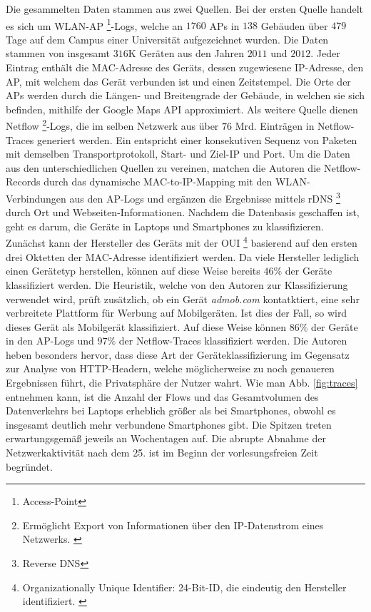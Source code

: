 \documentclass[12pt, a4paper]{article}
\begin{document}
Die gesammelten Daten stammen aus zwei Quellen. Bei der ersten Quelle handelt es sich um WLAN-AP \footnote{Access-Point}-Logs,
welche an $1760$ APs in $138$ Gebäuden über $479$ Tage auf dem Campus einer Universität aufgezeichnet wurden. 
Die Daten stammen von insgesamt $316$\textsc{K} Geräten aus den Jahren $2011$ und $2012$. Jeder Eintrag enthält die 
MAC-Adresse des Geräts, dessen zugewiesene IP-Adresse, den AP, mit welchem das Gerät verbunden ist und einen Zeitstempel.
Die Orte der APs werden durch die Längen- und Breitengrade der Gebäude, in welchen sie sich befinden, mithilfe der Google Maps API
approximiert. Als weitere Quelle dienen Netflow \footnote{Ermöglicht Export von Informationen über den IP-Datenstrom eines 
Netzwerks. \cite{RFC3954}}-Logs, die im selben Netzwerk aus über $76$ Mrd. Einträgen in Netflow-Traces generiert werden.
Ein  entspricht einer konsekutiven Sequenz von Paketen
mit demselben Transportprotokoll, Start- und Ziel-IP und Port. \cite{Alipour2018}
Um die Daten aus den unterschiedlichen Quellen zu vereinen, matchen die Autoren die Netflow-Records 
durch das dynamische MAC-to-IP-Mapping mit den WLAN-Verbindungen aus den AP-Logs und ergänzen
die Ergebnisse mittels rDNS \footnote{Reverse DNS} durch Ort und Webseiten-Informationen.
Nachdem die Datenbasis geschaffen ist, geht es darum, die Geräte in Laptops und Smartphones zu klassifizieren.
Zunächst kann der Hersteller des Geräts mit der OUI \footnote{Organizationally Unique Identifier: 24-Bit-ID, 
die eindeutig den Hersteller identifiziert. \cite{RFC5342}} basierend auf den ersten drei Oktetten der MAC-Adresse identifiziert werden.
Da viele Hersteller lediglich einen Gerätetyp herstellen, können auf diese Weise bereits
$46 \%$ der Geräte klassifiziert werden. Die Heuristik, welche von den Autoren zur Klassifizierung verwendet wird,
prüft zusätzlich, ob ein Gerät \textit{admob.com} kontatktiert, eine sehr verbreitete Plattform für Werbung auf Mobilgeräten.
Ist dies der Fall, so wird dieses Gerät als Mobilgerät klassifiziert. Auf diese Weise können $86 \%$ der Geräte in den AP-Logs
und $97 \%$ der Netflow-Traces klassifiziert werden.
Die Autoren heben besonders hervor, dass diese Art der Geräteklassifizierung im Gegensatz zur Analyse von 
HTTP-Headern, welche möglicherweise zu noch genaueren Ergebnissen führt, die Privatsphäre der Nutzer wahrt.\newline
Wie man Abb. \ref{fig:traces} entnehmen kann, ist die Anzahl der Flows und das Gesamtvolumen des Datenverkehrs bei Laptops
erheblich größer als bei Smartphones, obwohl es insgesamt deutlich mehr verbundene Smartphones gibt. 
Die Spitzen treten erwartungsgemäß jeweils an Wochentagen auf. 
Die abrupte Abnahme der Netzwerkaktivität nach dem 25. ist im Beginn der vorlesungsfreien Zeit begründet.
\end{document}
